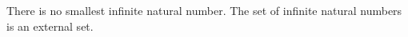 There is no smallest infinite natural number. The set of infinite natural numbers is an external set.
